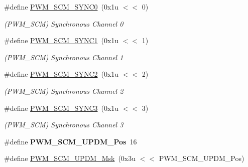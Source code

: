 \begin{DoxyCompactItemize}
\mbox{\label{group__SAMS70__PWM_gaba5a800dc0108c6efdf60e6e87946071}} 
\#define \mbox{\hyperlink{group__SAMS70__PWM_gaba5a800dc0108c6efdf60e6e87946071}{P\+W\+M\+\_\+\+S\+C\+M\+\_\+\+S\+Y\+N\+C0}}~(0x1u $<$$<$ 0)
\begin{DoxyCompactList}\small\item\em (P\+W\+M\+\_\+\+S\+CM) Synchronous Channel 0 \end{DoxyCompactList}\item 
\mbox{\label{group__SAMS70__PWM_ga8238b59e1eedc70791a3c2ac21b6198c}} 
\#define \mbox{\hyperlink{group__SAMS70__PWM_ga8238b59e1eedc70791a3c2ac21b6198c}{P\+W\+M\+\_\+\+S\+C\+M\+\_\+\+S\+Y\+N\+C1}}~(0x1u $<$$<$ 1)
\begin{DoxyCompactList}\small\item\em (P\+W\+M\+\_\+\+S\+CM) Synchronous Channel 1 \end{DoxyCompactList}\item 
\mbox{\label{group__SAMS70__PWM_ga10d1db9baeea99e727a31c8968e3a5f7}} 
\#define \mbox{\hyperlink{group__SAMS70__PWM_ga10d1db9baeea99e727a31c8968e3a5f7}{P\+W\+M\+\_\+\+S\+C\+M\+\_\+\+S\+Y\+N\+C2}}~(0x1u $<$$<$ 2)
\begin{DoxyCompactList}\small\item\em (P\+W\+M\+\_\+\+S\+CM) Synchronous Channel 2 \end{DoxyCompactList}\item 
\mbox{\label{group__SAMS70__PWM_ga58c6cd52a750aa0343f28d6fccc7e077}} 
\#define \mbox{\hyperlink{group__SAMS70__PWM_ga58c6cd52a750aa0343f28d6fccc7e077}{P\+W\+M\+\_\+\+S\+C\+M\+\_\+\+S\+Y\+N\+C3}}~(0x1u $<$$<$ 3)
\begin{DoxyCompactList}\small\item\em (P\+W\+M\+\_\+\+S\+CM) Synchronous Channel 3 \end{DoxyCompactList}\item 
\mbox{\label{group__SAMS70__PWM_gadbf2544fbd7ecd39ee57719c9cf3ff17}} 
\#define {\bfseries P\+W\+M\+\_\+\+S\+C\+M\+\_\+\+U\+P\+D\+M\+\_\+\+Pos}~16
\item 
\mbox{\label{group__SAMS70__PWM_gae3588984289a0472559bc899f4d5d6c0}} 
\#define \mbox{\hyperlink{group__SAMS70__PWM_gae3588984289a0472559bc899f4d5d6c0}{P\+W\+M\+\_\+\+S\+C\+M\+\_\+\+U\+P\+D\+M\+\_\+\+Msk}}~(0x3u $<$$<$ P\+W\+M\+\_\+\+S\+C\+M\+\_\+\+U\+P\+D\+M\+\_\+\+Pos)
$$
\end{DoxyCompactItemize}
